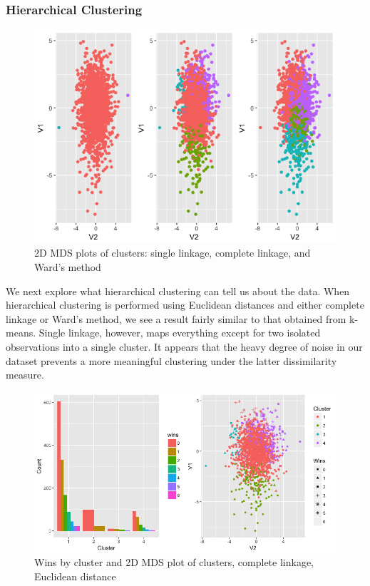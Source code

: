\documentclass[10pt,a4paper, hidelinks]{article} %
\begin{document}
\subsubsection{Hierarchical Clustering}

\begin{figure}[H]
	\centering
	\includegraphics[width=0.7\linewidth]{../fig/areyouheigh}
		\caption{2D MDS plots of clusters: single linkage, complete linkage, and Ward's method}
\end{figure}

We next explore what hierarchical clustering can tell us about the data. When hierarchical clustering is performed using Euclidean distances and either complete linkage or Ward's method, we see a result fairly similar to that obtained from k-means.  Single linkage, however, maps everything except for two isolated observations into a single cluster. It appears that the heavy degree of noise in our dataset prevents a more meaningful clustering under the latter dissimilarity measure.

\begin{figure}[H]
	\centering
	\includegraphics[width=0.7\linewidth]{../fig/comp1}
		\caption{Wins by cluster and 2D MDS plot of clusters, complete linkage, Euclidean distance}
\end{figure}
\end{document}
